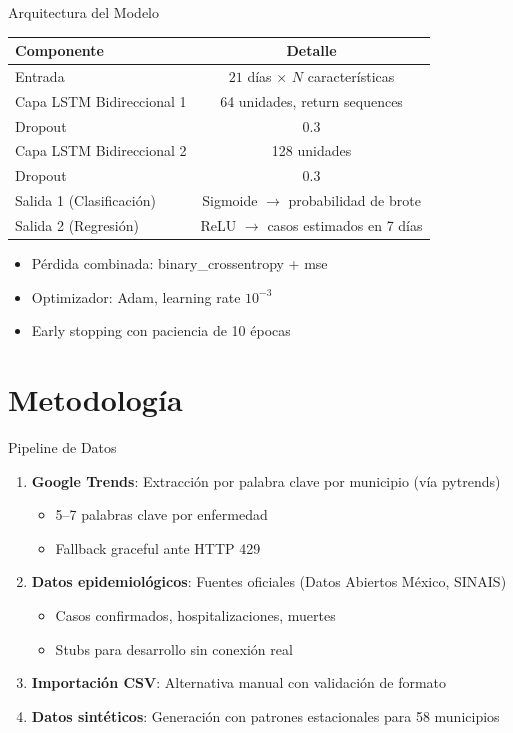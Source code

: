 \documentclass[10pt]{beamer}
\begin{document}
\begin{frame}{Arquitectura del Modelo}
  \centering
  \begin{tabular}{lc}
    \toprule
    \textbf{Componente} & \textbf{Detalle} \\
    \midrule
    Entrada & $21$ días $\times$ $N$ características \\
    Capa LSTM Bidireccional 1 & 64 unidades, return sequences \\
    Dropout & 0.3 \\
    Capa LSTM Bidireccional 2 & 128 unidades \\
    Dropout & 0.3 \\
    Salida 1 (Clasificación) & Sigmoide $\rightarrow$ probabilidad de brote \\
    Salida 2 (Regresión) & ReLU $\rightarrow$ casos estimados en 7 días \\
    \bottomrule
  \end{tabular}

  \begin{itemize}
    \item Pérdida combinada: binary\_crossentropy + mse
    \item Optimizador: Adam, learning rate $10^{-3}$
    \item Early stopping con paciencia de 10 épocas
  \end{itemize}
\end{frame}

\section{Metodología}

\begin{frame}{Pipeline de Datos}
  \begin{enumerate}
    \item \textbf{Google Trends}: Extracción por palabra clave por municipio (vía pytrends)
      \begin{itemize}
        \item 5--7 palabras clave por enfermedad
        \item Fallback graceful ante HTTP 429
      \end{itemize}
    \item \textbf{Datos epidemiológicos}: Fuentes oficiales (Datos Abiertos México, SINAIS)
      \begin{itemize}
        \item Casos confirmados, hospitalizaciones, muertes
        \item Stubs para desarrollo sin conexión real
      \end{itemize}
    \item \textbf{Importación CSV}: Alternativa manual con validación de formato
    \item \textbf{Datos sintéticos}: Generación con patrones estacionales para 58 municipios
  \end{enumerate}
\end{frame}
\end{document}
